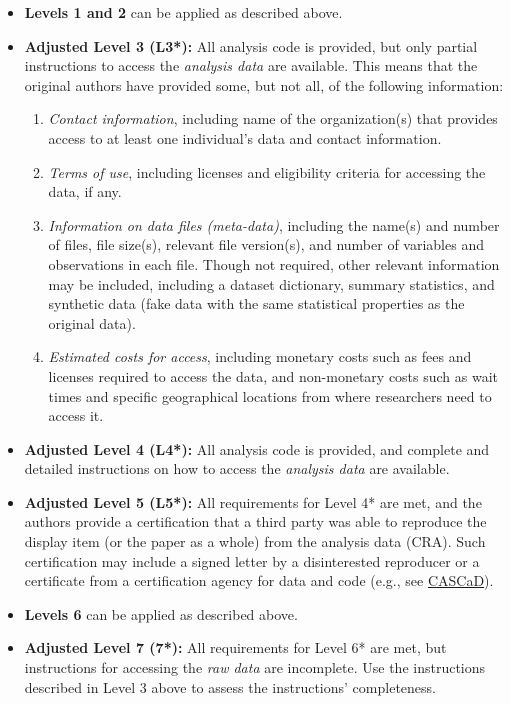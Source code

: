 \documentclass[
  openany]{book}
\providecommand{\tightlist}{%
  \setlength{\itemsep}{0pt}\setlength{\parskip}{0pt}}
\begin{document}
\begin{itemize}
\item
  \textbf{Levels 1 and 2} can be applied as described above.
\item
  \textbf{Adjusted Level 3 (L3*):} All analysis code is provided, but only partial instructions to access the \emph{analysis data} are available. This means that the original authors have provided some, but not all, of the following information:

  \begin{enumerate}
  \def\labelenumi{\alph{enumi}.}
  \tightlist
  \item
    \emph{Contact information}, including name of the organization(s) that provides access to at least one individual's data and contact information.
  \item
    \emph{Terms of use}, including licenses and eligibility criteria for accessing the data, if any.
  \item
    \emph{Information on data files (meta-data)}, including the name(s) and number of files, file size(s), relevant file version(s), and number of variables and observations in each file. Though not required, other relevant information may be included, including a dataset dictionary, summary statistics, and synthetic data (fake data with the same statistical properties as the original data).
  \item
    \emph{Estimated costs for access}, including monetary costs such as fees and licenses required to access the data, and non-monetary costs such as wait times and specific geographical locations from where researchers need to access it.
  \end{enumerate}
\item
  \textbf{Adjusted Level 4 (L4*):} All analysis code is provided, and complete and detailed instructions on how to access the \emph{analysis data} are available.
\item
  \textbf{Adjusted Level 5 (L5*):} All requirements for Level 4* are met, and the authors provide a certification that a third party was able to reproduce the display item (or the paper as a whole) from the analysis data (CRA). Such certification may include a signed letter by a disinterested reproducer or a certificate from a certification agency for data and code (e.g., see \href{https://www.cascad.tech/}{CASCaD}).
\item
  \textbf{Levels 6} can be applied as described above.
\item
  \textbf{Adjusted Level 7 (7*):} All requirements for Level 6* are met, but instructions for accessing the \emph{raw data} are incomplete. Use the instructions described in Level 3 above to assess the instructions' completeness.

\end{itemize}
\end{document}
